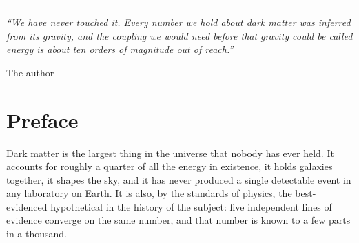 \clearpage
\thispagestyle{empty}
\vspace*{2.0in}
  \begin{center}
    \begin{minipage}{0.88\textwidth}
      \raggedright
      {\sffamily\color{accent}\rule{\textwidth}{2pt}}\par
      \vspace{14pt}
      {\large\itshape\color{txt}
      ``We have never touched it. Every number we hold about dark matter was
      inferred from its gravity, and the coupling we would need before that
      gravity could be called energy is about ten orders of magnitude out of
      reach.''\par}
      \vspace{12pt}
      {\raggedleft\sffamily\small\color{txtdim}
      The author\par}
    \end{minipage}
  \end{center}
  \vfill
\clearpage

\clearpage
{}
\tableofcontents

\clearpage
{}
\listoffigures

\clearpage
{}
\listoftables

\chapter*{Preface}

\thispagestyle{plain}

Dark matter is the largest thing in the universe that nobody has ever held.
It accounts for roughly a quarter of all the energy in existence, it holds
galaxies together, it shapes the sky, and it has never produced a single
detectable event in any laboratory on Earth. It is also, by the standards of
physics, the best-evidenced hypothetical in the history of the subject: five
independent lines of evidence converge on the same number, and that number is
known to a few parts in a thousand.


